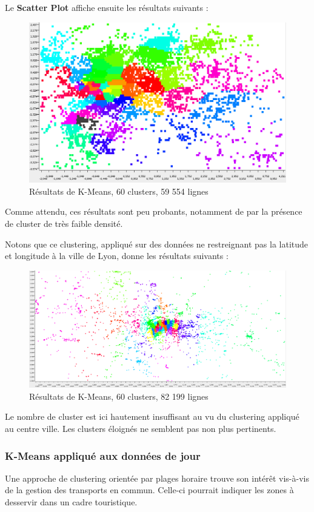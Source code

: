 Le \textbf{Scatter Plot} affiche ensuite les résultats suivants :
\begin{figure}[H]
    \centering
    \includegraphics[width=\linewidth]{img/60_means_all.png}
    \caption{Résultats de K-Means, 60 clusters, 59 554 lignes}
\end{figure}

Comme attendu, ces résultats sont peu probants, notamment de par la présence de cluster de très faible densité.

Notons que ce clustering, appliqué sur des données ne restreignant pas la latitude et longitude à la ville de Lyon, donne les résultats suivants :
\begin{figure}[H]
    \centering
    \includegraphics[width=\linewidth]{img/60_means_large.png}
    \caption{Résultats de K-Means, 60 clusters, 82 199 lignes}
\end{figure}

Le nombre de cluster est ici hautement insuffisant au vu du clustering appliqué au centre ville. Les clusters éloignés ne semblent pas non plus pertinents.



\subsubsection{K-Means appliqué aux données de jour}
Une approche de clustering orientée par plages horaire trouve son intérêt vis-à-vis de la gestion des transports en commun. Celle-ci pourrait indiquer les zones à desservir dans un cadre touristique.

